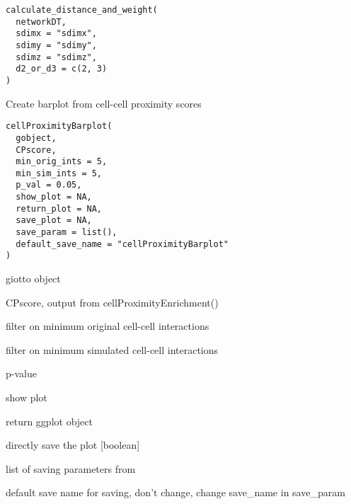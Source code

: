 \documentclass[a4paper]{book}
\begin{document}
%
\begin{Usage}
\begin{verbatim}
calculate_distance_and_weight(
  networkDT,
  sdimx = "sdimx",
  sdimy = "sdimy",
  sdimz = "sdimz",
  d2_or_d3 = c(2, 3)
)
\end{verbatim}
\end{Usage}
%
\begin{Description}\relax
Create barplot from cell-cell proximity scores
\end{Description}
%
\begin{Usage}
\begin{verbatim}
cellProximityBarplot(
  gobject,
  CPscore,
  min_orig_ints = 5,
  min_sim_ints = 5,
  p_val = 0.05,
  show_plot = NA,
  return_plot = NA,
  save_plot = NA,
  save_param = list(),
  default_save_name = "cellProximityBarplot"
)
\end{verbatim}
\end{Usage}
%
\begin{Arguments}
\begin{ldescription}
\item[\code{gobject}] giotto object

\item[\code{CPscore}] CPscore, output from cellProximityEnrichment()

\item[\code{min\_orig\_ints}] filter on minimum original cell-cell interactions

\item[\code{min\_sim\_ints}] filter on minimum simulated cell-cell interactions

\item[\code{p\_val}] p-value

\item[\code{show\_plot}] show plot

\item[\code{return\_plot}] return ggplot object

\item[\code{save\_plot}] directly save the plot [boolean]

\item[\code{save\_param}] list of saving parameters from 

\item[\code{default\_save\_name}] default save name for saving, don't change, change save\_name in save\_param
\end{ldescription}
\end{Arguments}
\end{document}
